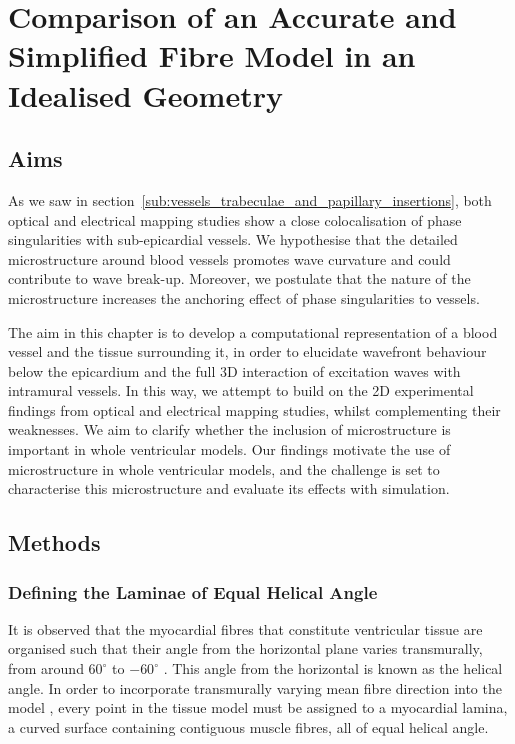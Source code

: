 \chapter{Comparison of an Accurate and Simplified Fibre Model in an Idealised Geometry}
\label{cha:comparison_of_an_accurate_and_simplified_fibre_model_in_an_idealised_geometry}
\dblspace
\begin{quote}{\em }\end{quote}

\section{Aims}
\label{sec:cha5:aims}
  As we saw in section~\ref{sub:vessels_trabeculae_and_papillary_insertions}, both optical and electrical mapping studies show a close colocalisation of phase singularities with sub-epicardial vessels. We hypothesise that the detailed microstructure around blood vessels promotes wave curvature and could contribute to wave break-up. Moreover, we postulate that the nature of the microstructure increases the anchoring effect of phase singularities to vessels.

  The aim in this chapter is to develop a computational representation of a blood vessel and the tissue surrounding it, in order to elucidate wavefront behaviour below the epicardium and the full 3D interaction of excitation waves with intramural vessels. In this way, we attempt to build on the 2D experimental findings from optical and electrical mapping studies, whilst complementing their weaknesses. We aim to clarify whether the inclusion of microstructure is important in whole ventricular models.  Our findings motivate the use of microstructure in whole ventricular models, and the challenge is set to characterise this microstructure and evaluate its effects with simulation.

\section{Methods} %
\label{sec:methods}
\subsection{Defining the Laminae of Equal Helical Angle} %
\label{sec:defining_the_laminae_of_equal_helical_angle}
  It is observed that the myocardial fibres that constitute ventricular tissue are organised such that their angle from the horizontal plane varies transmurally, from around $60^\circ$ to $-60^\circ$ \cite{StreeterJr1969}. This angle from the horizontal is known as the helical angle. In order to incorporate transmurally varying mean fibre direction into the model \cite{Potse2006}, every point in the tissue model must be assigned to a myocardial lamina, a curved surface containing contiguous muscle fibres, all of equal helical angle.
  
